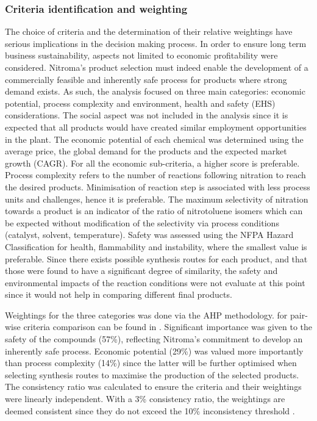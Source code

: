\subsubsection{Criteria identification and weighting}

The choice of criteria and the determination of their relative weightings have serious implications in the decision making process. In order to ensure long term business sustainability, aspects not limited to economic profitability were considered. Nitroma's product selection must indeed enable the development of a commercially feasible and inherently safe process for products where strong demand exists. As such, the analysis focused on three main categories: economic potential, process complexity and environment, health and safety (EHS) considerations. The social aspect was not included in the analysis since it is expected that all products would have created similar employment opportunities in the plant. 
The economic potential of each chemical was determined using the average price, the global demand for the products and the expected market growth (CAGR). For all the economic sub-criteria, a higher score is preferable. Process complexity refers to the number of reactions following nitration to reach the desired products. Minimisation of reaction step is associated with less process units and challenges, hence it is preferable. The maximum selectivity of nitration towards a product is an indicator of the ratio of nitrotoluene isomers which can be expected without modification of the selectivity via process conditions (catalyst, solvent, temperature). Safety was assessed using the NFPA Hazard Classification for health, flammability and instability, where the smallest value is preferable. Since there exists possible synthesis routes for each product, and that those were found to have a significant degree of similarity, the safety and environmental impacts of the reaction conditions were not evaluate at this point since it would not help in comparing different final products. 

Weightings for the three categories was done via the AHP methodology.  for pair-wise criteria comparison can be found in . Significant importance was given to the safety of the compounds (57\%), reflecting Nitroma's commitment to develop an inherently safe process. Economic potential (29\%) was valued more importantly than process complexity (14\%) since the latter will be further optimised when selecting synthesis routes to maximise the production of the selected products. The consistency ratio was calculated to ensure the criteria and their weightings were linearly independent. With a 3\% consistency ratio, the weightings are deemed consistent since they do not exceed the 10\% inconsistency threshold \cite{saaty_analytic_1987}.


